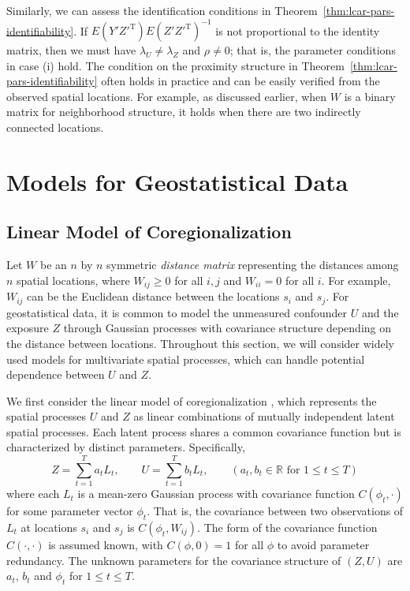 \documentclass[11pt]{article}
\theoremstyle{definition}
\theoremstyle{remark}
\def\top{{ \mathrm{\scriptscriptstyle T} }}
\begin{document}
Similarly, we can assess the identification conditions in Theorem~\ref{thm:lcar-pars-identifiability}. 
If \(E(Y'Z'^{\top})E(Z'Z'^{\top})^{-1}\) is not proportional to the identity matrix, 
then we must have \(\lambda_U \neq \lambda_Z\) and \(\rho \neq 0\); 
that is, the parameter conditions in case (i) hold. 
The condition on the proximity structure in Theorem~\ref{thm:lcar-pars-identifiability} often holds in practice and can be easily verified from the observed spatial locations. 
For example, 
as discussed earlier, 
when $W$ is a binary matrix for neighborhood structure, it holds when there are two indirectly connected locations.










\section{Models for Geostatistical Data}
\subsection{Linear Model of Coregionalization}
Let $W$ be an $n$ by $n$ symmetric {\it distance matrix} representing the distances among $n$ spatial locations, where $W_{ij}\ge 0$ for all $i,j$ and $W_{ii} = 0$ for all $i$. 
For example, $W_{ij}$ can be the Euclidean distance between the locations $s_i$ and $s_j$. 
For geostatistical data, it is common to model the unmeasured confounder $U$ and the exposure $Z$
through Gaussian processes with covariance structure depending on the distance between locations. 
Throughout this section, we will consider widely used models for multivariate spatial processes, which can handle potential dependence between $U$ and $Z$. 


We first consider the linear model of coregionalization \citep{wackernagel2003multivariate, gelfand2004nonstationary}, 
which represents the spatial processes $U$ and $Z$ as linear combinations of mutually independent latent spatial processes.
Each latent process shares a common covariance function but is characterized by distinct parameters.
Specifically, 
\begin{equation}\label{eq:LMC}
Z = \sum_{t=1}^T a_t L_t,  \qquad U = \sum_{t=1}^T b_t L_t,
\qquad (a_t, b_t \in\mathbb{R} \text{ for } 1\le t \le T) 
\end{equation}
where each $L_t$ is a mean-zero Gaussian process with covariance function $C(\phi_t, \cdot)$ for some parameter vector $\phi_t$. 
That is, the covariance between two observations of $L_t$ at locations $s_i$ and $s_j$ is $C(\phi_t, W_{ij})$. 
The form of the covariance function $C(\cdot, \cdot)$ is assumed known, with $C(\phi, 0) = 1$ for all $\phi$ to avoid parameter redundancy. 
The unknown parameters for the covariance structure of $(Z, U)$ are $a_t$, $b_t$ and $\phi_t$ for $1\le t \le T$. 
\end{document}
